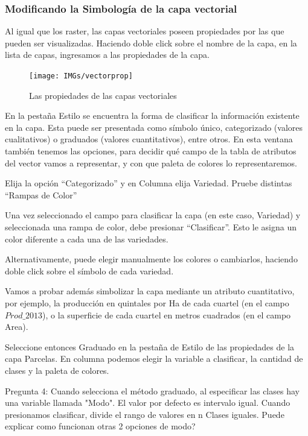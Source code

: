 \documentclass[onecolumn]{article}
\begin{document}
\subsubsection{Modificando la Simbología de la capa vectorial}

Al igual que los raster, las capas vectoriales poseen propiedades por las que pueden ser visualizadas. Haciendo doble click sobre el nombre de la capa, en la lista de capas, ingresamos a las propiedades de la capa. 

\begin{figure}
	\centering
	\texttt{[image: IMGs/vectorprop]}
	\caption{Las propiedades de las capas vectoriales}
	\label{fig:interfaz}
\end{figure}

En la pestaña Estilo se encuentra la forma de clasificar la información existente en la capa. 
Esta puede ser presentada como símbolo único, categorizado (valores cualitativos) o graduados (valores cuantitativos), entre otros.
En esta ventana también tenemos las opciones, para decidir qué campo de la tabla de atributos del vector vamos a representar, y con que paleta de colores lo representaremos. 

Elija la opción “Categorizado” y en Columna elija Variedad. Pruebe distintas “Rampas de Color”

Una vez seleccionado el campo para clasificar la capa (en este caso, Variedad) y seleccionada una rampa de color, debe presionar “Clasificar”. Esto le asigna un color diferente a cada una de las variedades. 

Alternativamente, puede elegir manualmente los colores o cambiarlos, haciendo doble click sobre el símbolo de cada variedad.

Vamos a probar además simbolizar la capa mediante un atributo cuantitativo, por ejemplo, la producción en quintales por Ha de cada cuartel (en el campo $Prod\_2013$), o la superficie de cada cuartel en metros cuadrados (en el campo Area).

Seleccione entonces Graduado en la pestaña de Estilo de las propiedades de la capa Parcelas. En columna podemos elegir la variable a clasificar, la cantidad de clases y la paleta de colores.

\begin{mdframed}[]
	Pregunta 4: Cuando selecciona el método graduado, al especificar las clases hay una variable llamada "Modo". El valor por defecto es intervalo igual. Cuando presionamos clasificar, divide el rango de valores en n Clases iguales. Puede explicar como funcionan otras 2 opciones de modo?
\end{mdframed}
\end{document}
